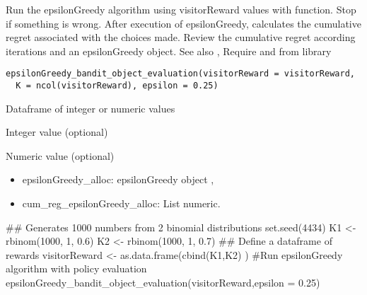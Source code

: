 \documentclass[letterpaper]{book}
\begin{document}
%
\begin{Description}\relax
Run the epsilonGreedy algorithm using visitorReward values with  function.
Stop if something is wrong.
After execution of epsilonGreedy, calculates the cumulative regret
associated with the choices made.
Review the cumulative regret according iterations and an epsilonGreedy object.
See also , 
Require  and  from  library
\end{Description}
%
\begin{Usage}
\begin{verbatim}
epsilonGreedy_bandit_object_evaluation(visitorReward = visitorReward,
  K = ncol(visitorReward), epsilon = 0.25)
\end{verbatim}
\end{Usage}
%
\begin{Arguments}
\begin{ldescription}
\item[\code{visitorReward}] Dataframe of integer or numeric values

\item[\code{K}] Integer value (optional)

\item[\code{epsilon}] Numeric value (optional)
\end{ldescription}
\end{Arguments}
%
\begin{Value}
\begin{itemize}
 List of element:
\item epsilonGreedy\_alloc: epsilonGreedy object ,
\item cum\_reg\_epsilonGreedy\_alloc: List numeric.

\end{itemize}

\end{Value}
%
\begin{Examples}
\begin{ExampleCode}
## Generates 1000 numbers from 2 binomial distributions
set.seed(4434)
K1 <- rbinom(1000, 1, 0.6)
K2 <- rbinom(1000, 1, 0.7)
## Define a dataframe of rewards
visitorReward <- as.data.frame(cbind(K1,K2) )
#Run epsilonGreedy algorithm with policy evaluation
epsilonGreedy_bandit_object_evaluation(visitorReward,epsilon = 0.25)

\end{ExampleCode}
\end{Examples}
\end{document}
